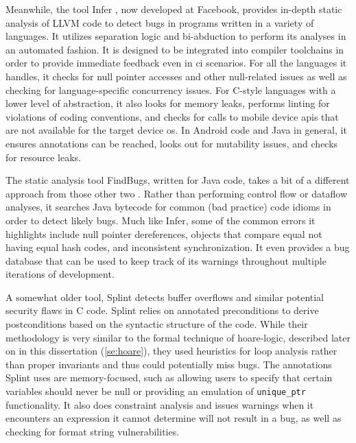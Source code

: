 Meanwhile, the tool Infer \autocite{calcagno2011infer}, now developed at Facebook,
provides in-depth static analysis of LLVM code to detect bugs in programs
written in a variety of languages.
It utilizes separation logic \autocite{reynolds2002separation}
and bi-abduction to perform its analyses in an automated fashion.
It is designed to be integrated into compiler toolchains
in order to provide immediate feedback even in \ac{ci} scenarios.
For all the languages it handles, it checks for null pointer accesses
and other null-related issues as well as checking for language-specific
concurrency issues.
For C-style languages with a lower level of abstraction,
it also looks for memory leaks, performs linting for violations of coding conventions,
and checks for calls to mobile device \acp{api} that are not available
for the target device \ac{os}.
In Android code and Java in general, it ensures annotations can be reached,
looks out for mutability issues, and checks for resource leaks.

The static analysis tool FindBugs, written for Java code,
takes a bit of a different approach from those other two
\autocite{hovemeyer2004findbugs}.
Rather than performing control flow or dataflow analyses,
it searches Java bytecode for common (bad practice) code idioms
in order to detect likely bugs. Much like Infer,
some of the common errors it highlights include null pointer dereferences,
objects that compare equal not having equal hash codes,
and inconsistent synchronization.
It even provides a bug database that can be used to keep track of its warnings
throughout multiple iterations of development.

A somewhat older tool, Splint \autocite{evans2002static} detects buffer overflows
and similar potential security flaws in C code.
Splint relies on annotated preconditions to derive postconditions
based on the syntactic structure of the code.
While their methodology is very similar to the formal technique of \gls{hoare-logic},
described later on in this dissertation (\cref{se:hoare}),
they used heuristics for loop analysis rather than proper invariants
and thus could potentially miss bugs.
The annotations Splint uses are memory-focused, such as allowing users to specify
that certain variables should never be null or providing an emulation of
\lstinline|unique_ptr| functionality. It also does constraint analysis
and issues warnings when it encounters an expression it cannot determine
will not result in a bug, as well as checking for format string vulnerabilities.

